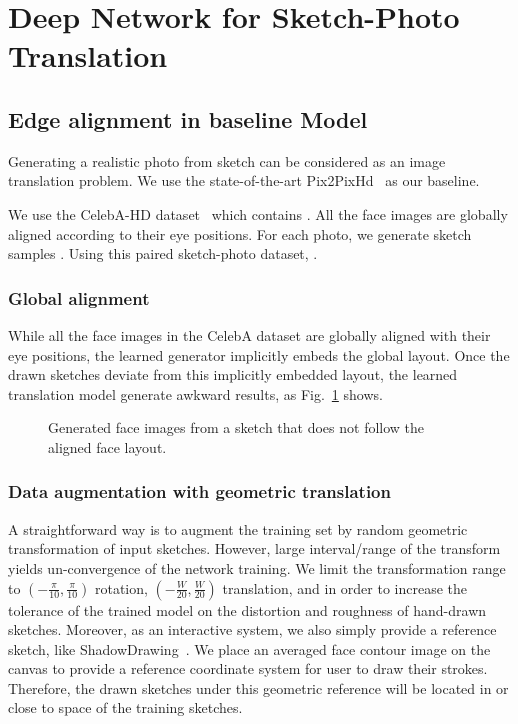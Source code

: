
\section{Deep Network for Sketch-Photo Translation}
\label{sec:network}

\subsection{Edge alignment in baseline Model}

Generating a realistic photo from sketch can be considered as an image translation problem. 
We use the state-of-the-art Pix2PixHd~\cite{} as our baseline. 
% 
 
We use the CelebA-HD dataset~\cite{} which contains . All the face images are globally aligned according to their eye positions. 
For each photo, we generate sketch samples .
%
Using this paired sketch-photo dataset, .

\subsubsection{Global alignment}
While all the face images in the CelebA dataset \cite{} are globally aligned with their eye positions, the learned generator implicitly embeds the global layout. Once the drawn sketches deviate from this implicitly embedded layout, the learned translation model generate awkward results, as Fig.~\ref{fig:global-align-fail} shows. 


\begin{figure}
	\centering
	\vspace{1.0cm}
	\caption{Generated face images from a sketch that does not follow the aligned face layout.}
	\label{fig:global-align-fail}
\end{figure}

\subsubsection{Data augmentation with geometric translation}
A straightforward way is to augment the training set by random geometric transformation of input sketches. 
However, large interval/range of the transform yields un-convergence of the network training. 
We limit the transformation range to $(-\frac{\pi}{10},\frac{\pi}{10})$ rotation, $(-\frac{W}{20},\frac{W}{20})$ translation, and  in order to increase the tolerance of the trained model on the distortion and roughness of hand-drawn sketches. 
%
Moreover, as an interactive system, we also simply provide a reference sketch, like ShadowDrawing~\cite{}.
We place an averaged face contour image on the canvas to provide a reference coordinate system for user to draw their strokes. 
Therefore, the drawn sketches under this geometric reference will be located in or close to space of the training sketches.


